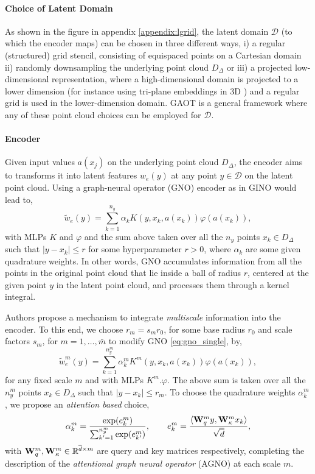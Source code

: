 \documentclass[reqno,10pt]{amsart}
\theoremstyle{plain}
\theoremstyle{definition}
\newcommand{\bb}[1]{\mathbb{#1}}
\newcommand{\cal}[1]{\mathcal{#1}}
\begin{document}
\paragraph{\bf Choice of Latent Domain} 
As shown in the figure in appendix \ref{appendix:lgrid}, the latent domain $\cal D$ (to which the encoder maps) can be chosen in three different ways, i) a regular (structured) grid stencil, consisting of equispaced points on a Cartesian domain ii) randomly downsampling the underlying point cloud $D_\Delta$ or iii) a projected low-dimensional representation, where a high-dimensional domain is projected to a lower dimension (for instance using tri-plane embeddings in 3D \cite{QC2025}) and a regular grid is used in the lower-dimension domain. GAOT is a general framework where any of these point cloud choices can be employed for $\cal D$.

\paragraph{\bf Encoder} Given input values $a(x_j)$ on the underlying point cloud $D_\Delta$, the encoder aims to transforms it into latent features $w_e(y)$ at any point $y \in \cal D$ on the latent point cloud. Using a graph-neural operator (GNO) encoder as in GINO \cite{ZL2023} would lead to,
\begin{equation}\label{eq:gno_single}
    \tilde{w}_e(y) = \sum_{k=1}^{n_y} \alpha_k K(y,x_k,a(x_k)) \varphi(a(x_k)),
\end{equation}
with MLPs $K$ and $\varphi$ and the sum above taken over all the $n_y$ points $x_k \in D_\Delta$ such that $|y-x_k| \leq r$ for some hyperparameter $r > 0$, where $\alpha_k$ are some given quadrature weights. In other words, GNO accumulates information from all the points in the original point cloud that lie inside a ball of radius $r$, centered at the given point $y$ in the latent point cloud, and processes them through a kernel integral.

\noindent Authors propose a mechanism to integrate {\it multiscale} information into the encoder. To this end, we choose $r_m = s_m r_0$, for some base radius $r_0$ and scale factors $s_m$, for $m = 1, \dots, \bar{m}$ to modify GNO \ref{eq:gno_single}, by,
\begin{equation}\label{eq:agno}
    \tilde{w}_e^m (y) = \sum_{k=1}^{n_y^m} \alpha_k^m K^m (y,x_k,a(x_k)) \varphi(a(x_k)),
\end{equation}
for any fixed scale $m$ and with MLPs $K^m. \varphi$. The above sum is taken over all the $n^m_y$ points $x_k \in D_\Delta$ such that $|y-x_k| \leq r_m$. To choose the quadrature weights $\alpha_k^m$, we propose an {\it attention based} choice,
\begin{equation}
    \alpha_k^m = \frac{\exp(e^m_k)}{\sum_{k'=1}^{n_y^m} \exp(e^m_{k'})}, \qquad e^m_k = \frac{\langle {\bf W}_q^m y,{\bf W}_\kappa^m x_k \rangle}{\sqrt{\overline{d}}},
\end{equation}
with ${\bf W}_q^m,{\bf W}_\kappa^m \in \bb R^{\overline{d} \times m}$ are query and key matrices respectively, completing the description of the {\it attentional graph neural operator} (AGNO) at each scale $m$.
\end{document}
